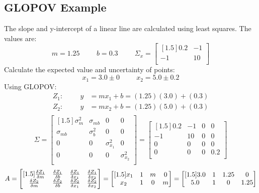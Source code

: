 \subsection{GLOPOV Example}

The slope and y-intercept of a linear line are calculated using least squares.  The values are:
\[
m = 1.25 \hspace{1cm} b = 0.3 \hspace{1cm} \Sigma_x = 
\begin{bmatrix}[1.5]
0.2 & -1 \\
-1 & 10 \\
\end{bmatrix}
\]
Calculate the expected value and uncertainty of points:
\[
x_1 = 3.0\pm 0 \hspace{1cm} x_2 = 5.0 \pm 0.2 
\]
Using GLOPOV:
\begin{align*}
Z_1: \hspace{1cm} y &= mx_1+b = (1.25)(3.0) + (0.3) \\
Z_2: \hspace{1cm} y &= mx_2+b = (1.25)(5.0) + (0.3) \\
\end{align*}
\[
\Sigma = 
\begin{bmatrix}[1.5]
\sigma^2_{m} & \sigma_{mb}  & 0 & 0\\
\sigma_{mb} & \sigma^2_{b}  & 0 & 0\\
0 & 0  & \sigma^2_{x_1} & 0 \\
0 & 0  & 0 & \sigma^2_{x_2} \\
\end{bmatrix}
=
\begin{bmatrix}[1.5]
0.2 & -1  & 0 & 0\\
-1 & 10  & 0 & 0\\
0 & 0  & 0 & 0 \\
0 & 0  & 0 & 0.2 \\
\end{bmatrix}
\]
\[
A = 
\begin{bmatrix}[1.5]
\frac{\delta Z_1}{\delta m} & \frac{\delta Z_1}{\delta b} & \frac{\delta Z_1}{\delta x_1} & \frac{\delta Z_1}{\delta x_2} \\
\frac{\delta Z_2}{\delta m} & \frac{\delta Z_2}{\delta b} & \frac{\delta Z_2}{\delta x_1} & \frac{\delta Z_2}{\delta x_2} \\
\end{bmatrix}
= 
\begin{bmatrix}[1.5]
x_1 & 1 & m & 0 \\
x_2 & 1 & 0 & m \\
\end{bmatrix}
=
\begin{bmatrix}[1.5]
3.0 & 1 & 1.25 & 0 \\
5.0 & 1 & 0 & 1.25 \\
\end{bmatrix}
\]
